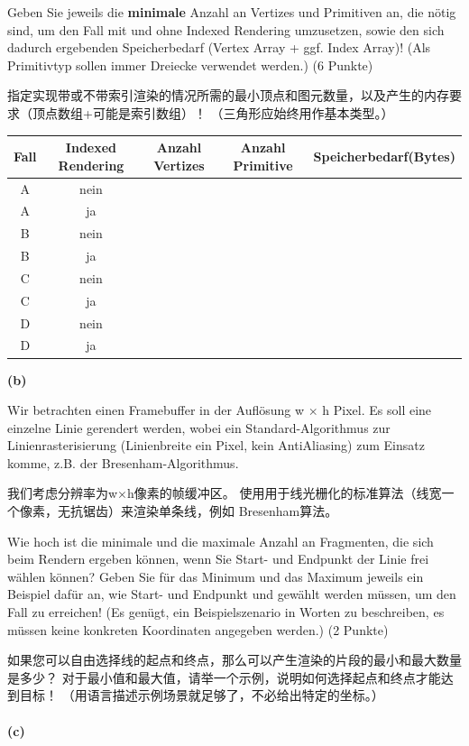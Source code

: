 \documentclass[fleqn]{article}
\begin{document}
Geben Sie jeweils die \textbf{minimale} Anzahl an Vertizes und Primitiven an, die nötig sind, um den Fall mit und ohne Indexed Rendering umzusetzen, sowie den sich dadurch ergebenden Speicherbedarf (Vertex Array + ggf. Index Array)! (Als Primitivtyp sollen immer Dreiecke verwendet werden.) (6 Punkte)

指定实现带或不带索引渲染的情况所需的最小顶点和图元数量，以及产生的内存要求（顶点数组+可能是索引数组）！ （三角形应始终用作基本类型。）

\begin{center}
    \begin{tabular}{|c|c|c|c|c|}
        \hline
        Fall&Indexed Rendering&Anzahl Vertizes&Anzahl Primitive&Speicherbedarf(Bytes)\\
        \hline
        A&nein&&&\\
        \hline
        A&ja&&&\\
        \hline
        B&nein&&&\\
        \hline
        B&ja&&&\\
        \hline
        C&nein&&&\\
        \hline
        C&ja&&&\\
        \hline
        D&nein&&&\\
        \hline
        D&ja&&&\\
        \hline
    \end{tabular}
\end{center}

\noindent\textbf{(b)}

Wir betrachten einen Framebuffer in der Auflösung w $\times$ h Pixel. Es soll eine einzelne Linie gerendert werden, wobei ein Standard-Algorithmus zur Linienrasterisierung (Linienbreite ein Pixel, kein AntiAliasing) zum Einsatz komme, z.B. der Bresenham-Algorithmus. 

我们考虑分辨率为w$\times$h像素的帧缓冲区。 使用用于线光栅化的标准算法（线宽一个像素，无抗锯齿）来渲染单条线，例如 Bresenham算法。

Wie hoch ist die minimale und die maximale Anzahl an Fragmenten, die sich beim Rendern ergeben können, wenn Sie Start- und Endpunkt der Linie frei wählen können? Geben Sie für das Minimum und das Maximum jeweils ein Beispiel dafür an, wie Start- und Endpunkt und gewählt werden müssen, um den Fall zu erreichen! (Es genügt, ein Beispielszenario in Worten zu beschreiben, es müssen keine konkreten Koordinaten angegeben werden.) (2 Punkte)

如果您可以自由选择线的起点和终点，那么可以产生渲染的片段的最小和最大数量是多少？ 对于最小值和最大值，请举一个示例，说明如何选择起点和终点才能达到目标！ （用语言描述示例场景就足够了，不必给出特定的坐标。）
\\
\\
\noindent\textbf{(c)}
\end{document}
